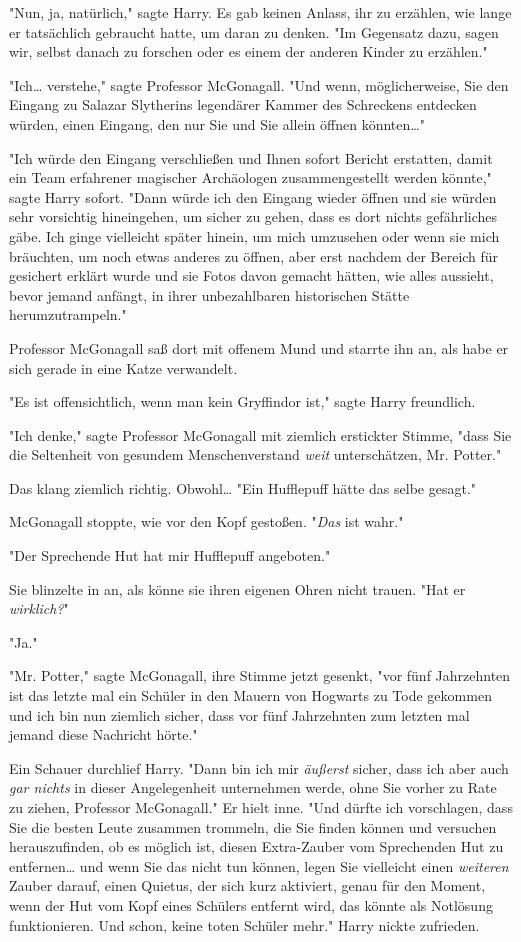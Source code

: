 {"Nun, ja, natürlich," sagte Harry. Es gab keinen Anlass, ihr zu erzählen, wie lange er tatsächlich gebraucht hatte, um daran zu denken. "Im Gegensatz dazu, sagen wir, selbst danach zu forschen oder es einem der anderen Kinder zu erzählen."

"Ich… verstehe," sagte Professor McGonagall. "Und wenn, möglicherweise, Sie den Eingang zu Salazar Slytherins legendärer Kammer des Schreckens entdecken würden, einen Eingang, den nur Sie und Sie allein öffnen könnten…"

"Ich würde den Eingang verschließen und Ihnen sofort Bericht erstatten, damit ein Team erfahrener magischer Archäologen zusammengestellt werden könnte," sagte Harry sofort. "Dann würde ich den Eingang wieder öffnen und sie würden sehr vorsichtig hineingehen, um sicher zu gehen, dass es dort nichts gefährliches gäbe. Ich ginge vielleicht später hinein, um mich umzusehen oder wenn sie mich bräuchten, um noch etwas anderes zu öffnen, aber erst nachdem der Bereich für gesichert erklärt wurde und sie Fotos davon gemacht hätten, wie alles aussieht, bevor jemand anfängt, in ihrer unbezahlbaren historischen Stätte herumzutrampeln."

Professor McGonagall saß dort mit offenem Mund und starrte ihn an, als habe er sich gerade in eine Katze verwandelt.

"Es ist offensichtlich, wenn man kein Gryffindor ist," sagte Harry freundlich.

"Ich denke," sagte Professor McGonagall mit ziemlich erstickter Stimme, "dass Sie die Seltenheit von gesundem Menschenverstand \emph{weit} unterschätzen, Mr. Potter."

Das klang ziemlich richtig. Obwohl… "Ein Hufflepuff hätte das selbe gesagt."

McGonagall stoppte, wie vor den Kopf gestoßen. "\emph{Das} ist wahr."

"Der Sprechende Hut hat mir Hufflepuff angeboten."

Sie blinzelte in an, als könne sie ihren eigenen Ohren nicht trauen. "Hat er \emph{wirklich?}"

"Ja."

"Mr. Potter," sagte McGonagall, ihre Stimme jetzt gesenkt, "vor fünf Jahrzehnten ist das letzte mal ein Schüler in den Mauern von Hogwarts zu Tode gekommen und ich bin nun ziemlich sicher, dass vor fünf Jahrzehnten zum letzten mal jemand diese Nachricht hörte."

Ein Schauer durchlief Harry. "Dann bin ich mir \emph{äußerst} sicher, dass ich aber auch \emph{gar nichts} in dieser Angelegenheit unternehmen werde, ohne Sie vorher zu Rate zu ziehen, Professor McGonagall." Er hielt inne. "Und dürfte ich vorschlagen, dass Sie die besten Leute zusammen trommeln, die Sie finden können und versuchen herauszufinden, ob es möglich ist, diesen Extra-Zauber vom Sprechenden Hut zu entfernen… und wenn Sie das nicht tun können, legen Sie vielleicht einen \emph{weiteren} Zauber darauf, einen Quietus, der sich kurz aktiviert, genau für den Moment, wenn der Hut vom Kopf eines Schülers entfernt wird, das könnte als Notlösung funktionieren. Und schon, keine toten Schüler mehr." Harry nickte zufrieden.

}
